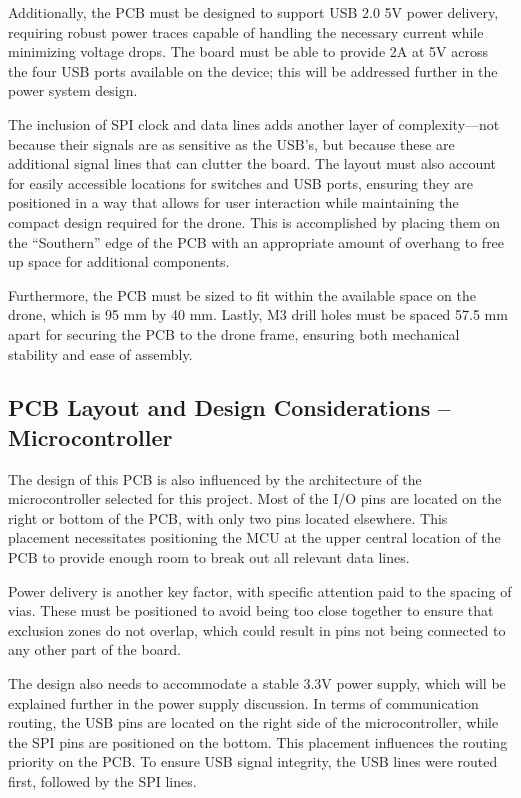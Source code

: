 \documentclass[12pt]{article}
\begin{document}
\par Additionally, the PCB must be designed to support USB 2.0 5V power delivery, requiring robust power traces capable of handling the necessary current while minimizing voltage drops. The board must be able to provide 2A at 5V across the four USB ports available on the device; this will be addressed further in the power system design.

\par The inclusion of SPI clock and data lines adds another layer of complexity—not because their signals are as sensitive as the USB’s, but because these are additional signal lines that can clutter the board. The layout must also account for easily accessible locations for switches and USB ports, ensuring they are positioned in a way that allows for user interaction while maintaining the compact design required for the drone. This is accomplished by placing them on the ``Southern'' edge of the PCB with an appropriate amount of overhang to free up space for additional components.

\par Furthermore, the PCB must be sized to fit within the available space on the drone, which is 95 mm by 40 mm. Lastly, M3 drill holes must be spaced 57.5 mm apart for securing the PCB to the drone frame, ensuring both mechanical stability and ease of assembly.

\subsection{PCB Layout and Design Considerations – Microcontroller}
The design of this PCB is also influenced by the architecture of the microcontroller selected for this project. Most of the I/O pins are located on the right or bottom of the PCB, with only two pins located elsewhere. This placement necessitates positioning the MCU at the upper central location of the PCB to provide enough room to break out all relevant data lines.

\par Power delivery is another key factor, with specific attention paid to the spacing of vias. These must be positioned to avoid being too close together to ensure that exclusion zones do not overlap, which could result in pins not being connected to any other part of the board.

\par The design also needs to accommodate a stable 3.3V power supply, which will be explained further in the power supply discussion. In terms of communication routing, the USB pins are located on the right side of the microcontroller, while the SPI pins are positioned on the bottom. This placement influences the routing priority on the PCB. To ensure USB signal integrity, the USB lines were routed first, followed by the SPI lines.
\end{document}
